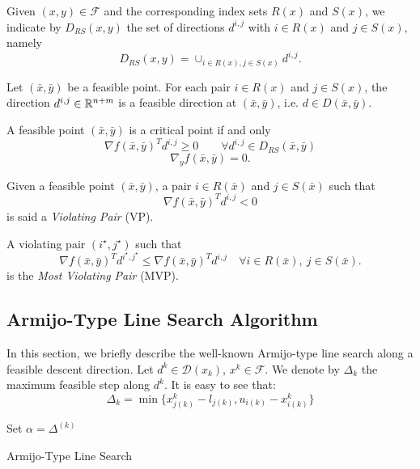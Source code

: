 Given $(x, y) \in \mathcal{F}$ and the corresponding index sets $R(x)$ and $S(x)$, we indicate by $D_{RS}(x,y)$
the set of directions $d^{i,j}$ with $i \in R(x)$ and $j \in S(x)$, namely
$$
D_{RS}(x,y)=\cup_{i\in R(x),j\in S(x)}d^{i,j}.
$$
\begin{proposition}\label{3.1}
Let $(\bar x,\bar y)$ be a feasible point. For each pair $i \in R(x)$ and $j \in S(x)$, the
direction $d^{i,j}\in \mathbb{R}^{n+m}$ is a feasible direction at $(\bar x,\bar y)$, i.e. $d \in D(\bar x,\bar y)$.
\end{proposition}
\begin{proposition}\label{3.2}
A feasible point $(\bar x,\bar y)$
 is a critical point if and only
\begin{equation}\label{on_x2}
\nabla f(\bar x,\bar y)^Td^{i,j}\ge 0\quad\quad \forall d^{i,j}\in D_{RS}(\bar x,\bar y)
\end{equation}
\begin{equation}\label{on_y3}
 \nabla_y f(\bar x,\bar y)=0.
\end{equation} 
\end{proposition}
Given a feasible point $(\bar x,\bar y)$, a pair $i\in R(\bar x)$ and $j\in S(\bar x)$ such that
$$
\nabla f(\bar x,\bar y)^Td^{i,j}<0
$$
is said a {\it Violating Pair} (VP).

A violating pair $(i^\star,j^\star)$ such that 
\begin{equation}\label{mvp}
 \nabla f(\bar x,\bar y)^Td^{i^\star,j^\star}\le \nabla f(\bar x,\bar y)^Td^{i,j} \quad \forall i\in R(\bar x), \ j\in S(\bar x).
\end{equation}
is the {\it Most Violating Pair} (MVP).

\subsection{Armijo-Type Line Search Algorithm}
In this section, we briefly describe the well-known Armijo-type line search along a feasible descent direction. 
Let $d^{k} \in \mathcal{D}(x_k)$, $x^{k} \in \mathcal{F}$. We denote by $\Delta_{k}$ the maximum feasible step along $d^{k}$. It is easy to see that:
\begin{equation*}
\Delta_k= \min \{ x^k_{j(k)}-l_{j(k)}, u_{i(k)}-x^k_{i(k)}\}
\end{equation*}

\begin{algorithm}[ht]
 Set $\alpha = \Delta^{(k)}$\\
 \caption{Armijo-Type Line Search}
\end{algorithm}


